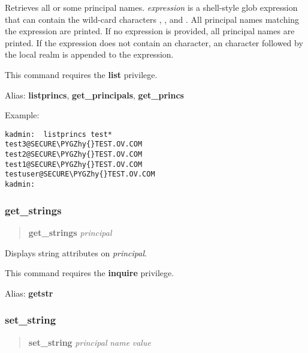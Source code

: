 \documentclass[letterpaper,10pt,english]{sphinxmanual}
\def\PYGZhy{\char`\-}
\begin{document}
Retrieves all or some principal names.  \emph{expression} is a shell-style
glob expression that can contain the wild-card characters ,
\code{*}, and \code{{[}{]}}.  All principal names matching the expression are
printed.  If no expression is provided, all principal names are
printed.  If the expression does not contain an  character, an
 character followed by the local realm is appended to the
expression.

This command requires the \textbf{list} privilege.

Alias: \textbf{listprincs}, \textbf{get\_principals}, \textbf{get\_princs}

Example:

\begin{Verbatim}[commandchars=\\\{\}]
kadmin:  listprincs test*
test3@SECURE\PYGZhy{}TEST.OV.COM
test2@SECURE\PYGZhy{}TEST.OV.COM
test1@SECURE\PYGZhy{}TEST.OV.COM
testuser@SECURE\PYGZhy{}TEST.OV.COM
kadmin:
\end{Verbatim}
\label{admin/admin_commands/kadmin_local:list-principals-end}

\subsubsection{get\_strings}
\label{admin/admin_commands/kadmin_local:id9}\label{admin/admin_commands/kadmin_local:get-strings}\label{admin/admin_commands/kadmin_local:list-principals-end}\begin{quote}

\textbf{get\_strings} \emph{principal}
\end{quote}

Displays string attributes on \emph{principal}.

This command requires the \textbf{inquire} privilege.

Alias: \textbf{getstr}
\label{admin/admin_commands/kadmin_local:get-strings-end}

\subsubsection{set\_string}
\label{admin/admin_commands/kadmin_local:id10}\label{admin/admin_commands/kadmin_local:set-string}\label{admin/admin_commands/kadmin_local:get-strings-end}\begin{quote}

\textbf{set\_string} \emph{principal} \emph{name} \emph{value}
\end{quote}
\end{document}
